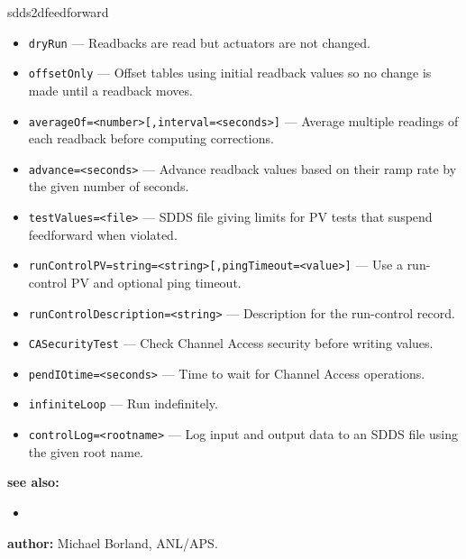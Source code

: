 \begin{sddsprog}{sdds2dfeedforward}
\begin{itemize}
  \item {\tt dryRun} --- Readbacks are read but actuators are not changed.
  \item {\tt offsetOnly} --- Offset tables using initial readback values so
               no change is made until a readback moves.
  \item {\tt averageOf=<number>[,interval=<seconds>]} --- Average multiple
               readings of each readback before computing corrections.
  \item {\tt advance=<seconds>} --- Advance readback values based on their
               ramp rate by the given number of seconds.
  \item {\tt testValues=<file>} --- SDDS file giving limits for PV tests that
               suspend feedforward when violated.
  \item {\tt runControlPV=string=<string>[,pingTimeout=<value>]} --- Use a
               run-control PV and optional ping timeout.
  \item {\tt runControlDescription=<string>} --- Description for the
               run-control record.
  \item {\tt CASecurityTest} --- Check Channel Access security before
               writing values.
  \item {\tt pendIOtime=<seconds>} --- Time to wait for Channel Access
               operations.
  \item {\tt infiniteLoop} --- Run indefinitely.
  \item {\tt controlLog=<rootname>} --- Log input and output data to an
               SDDS file using the given root name.
\end{itemize}
\item \textbf{see also:}
\begin{itemize}
  \item {}
\end{itemize}
\item \textbf{author:} Michael Borland, ANL/APS.
\end{sddsprog}
